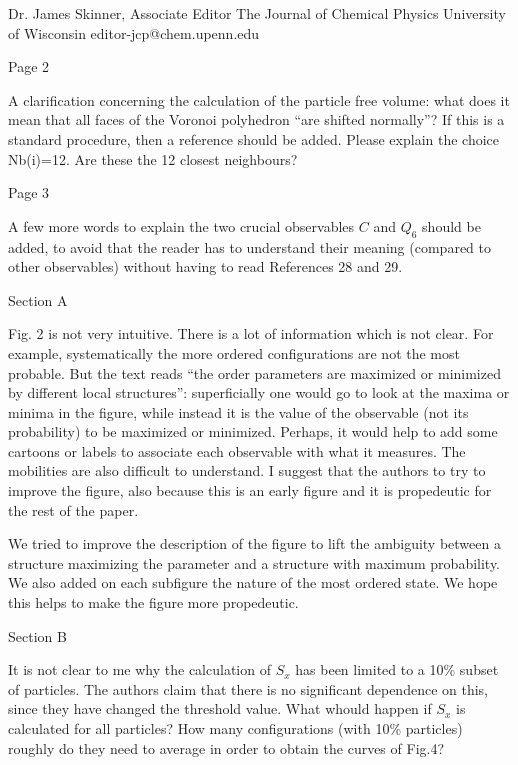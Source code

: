 \documentclass[a4paper, rebuttal, parskip=true, firsthead=false, fromemail=true, foldmarks=false]{scrlttr2}
\begin{document}
\begin{letter}{Dr. James Skinner, Associate Editor
The Journal of Chemical Physics
University of Wisconsin
editor-jcp@chem.upenn.edu }
\begin{quotationi}
Page 2

A clarification concerning the calculation of the particle free volume: what does it mean that all faces of the Voronoi polyhedron ``are shifted normally''? If this is a standard procedure, then a reference should be added.
Please explain the choice Nb(i)=12. Are these the 12 closest neighbours?
\end{quotationi}

\begin{quotationi}
Page 3

A few more words to explain the two crucial observables $C$ and $Q_6$ should be added, to avoid that the reader has to understand their meaning (compared to other observables) without having to read References 28 and 29.
\end{quotationi}

\begin{quotationi}
Section A

Fig. 2 is not very intuitive. There is a lot of information which is not clear. For example, systematically the more ordered configurations are not the most probable. But the text reads ``the order parameters are maximized or minimized by different local structures'': superficially one would go to look at the maxima or minima in the figure, while instead it is the value of the observable (not its probability) to be maximized or minimized. Perhaps, it would help to add some cartoons or labels to associate each observable with what it measures. The mobilities are also difficult to understand. I suggest that the authors to try to improve the figure, also because this is an early figure and it is propedeutic for the rest of the paper.
\end{quotationi}

We tried to improve the description of the figure to lift the ambiguity between a structure maximizing the parameter and a structure with maximum probability. We also added on each subfigure the nature of the most ordered state. We hope this helps to make the figure more propedeutic.

\begin{quotationi}
Section B

It is not clear to me why the calculation of $S_x$ has been limited to a 10\% subset of particles. The authors claim that there is no significant dependence on this, since they have changed the threshold value. What whould happen if $S_x$ is calculated for all particles? How many configurations (with 10\% particles) roughly do they need to average in order to obtain the curves of Fig.4?
\end{quotationi}


\end{letter}
\end{document}

